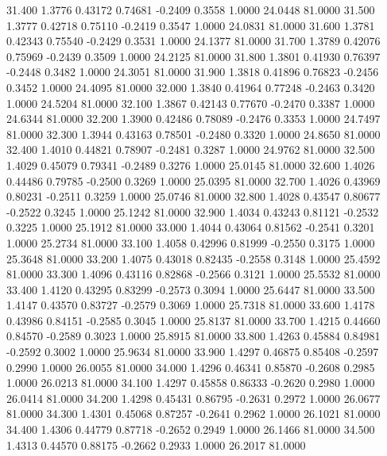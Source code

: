   31.400   1.3776   0.43172   0.74681  -0.2409   0.3558   1.0000  24.0448  81.0000
  31.500   1.3777   0.42718   0.75110  -0.2419   0.3547   1.0000  24.0831  81.0000
  31.600   1.3781   0.42343   0.75540  -0.2429   0.3531   1.0000  24.1377  81.0000
  31.700   1.3789   0.42076   0.75969  -0.2439   0.3509   1.0000  24.2125  81.0000
  31.800   1.3801   0.41930   0.76397  -0.2448   0.3482   1.0000  24.3051  81.0000
  31.900   1.3818   0.41896   0.76823  -0.2456   0.3452   1.0000  24.4095  81.0000
  32.000   1.3840   0.41964   0.77248  -0.2463   0.3420   1.0000  24.5204  81.0000
  32.100   1.3867   0.42143   0.77670  -0.2470   0.3387   1.0000  24.6344  81.0000
  32.200   1.3900   0.42486   0.78089  -0.2476   0.3353   1.0000  24.7497  81.0000
  32.300   1.3944   0.43163   0.78501  -0.2480   0.3320   1.0000  24.8650  81.0000
  32.400   1.4010   0.44821   0.78907  -0.2481   0.3287   1.0000  24.9762  81.0000
  32.500   1.4029   0.45079   0.79341  -0.2489   0.3276   1.0000  25.0145  81.0000
  32.600   1.4026   0.44486   0.79785  -0.2500   0.3269   1.0000  25.0395  81.0000
  32.700   1.4026   0.43969   0.80231  -0.2511   0.3259   1.0000  25.0746  81.0000
  32.800   1.4028   0.43547   0.80677  -0.2522   0.3245   1.0000  25.1242  81.0000
  32.900   1.4034   0.43243   0.81121  -0.2532   0.3225   1.0000  25.1912  81.0000
  33.000   1.4044   0.43064   0.81562  -0.2541   0.3201   1.0000  25.2734  81.0000
  33.100   1.4058   0.42996   0.81999  -0.2550   0.3175   1.0000  25.3648  81.0000
  33.200   1.4075   0.43018   0.82435  -0.2558   0.3148   1.0000  25.4592  81.0000
  33.300   1.4096   0.43116   0.82868  -0.2566   0.3121   1.0000  25.5532  81.0000
  33.400   1.4120   0.43295   0.83299  -0.2573   0.3094   1.0000  25.6447  81.0000
  33.500   1.4147   0.43570   0.83727  -0.2579   0.3069   1.0000  25.7318  81.0000
  33.600   1.4178   0.43986   0.84151  -0.2585   0.3045   1.0000  25.8137  81.0000
  33.700   1.4215   0.44660   0.84570  -0.2589   0.3023   1.0000  25.8915  81.0000
  33.800   1.4263   0.45884   0.84981  -0.2592   0.3002   1.0000  25.9634  81.0000
  33.900   1.4297   0.46875   0.85408  -0.2597   0.2990   1.0000  26.0055  81.0000
  34.000   1.4296   0.46341   0.85870  -0.2608   0.2985   1.0000  26.0213  81.0000
  34.100   1.4297   0.45858   0.86333  -0.2620   0.2980   1.0000  26.0414  81.0000
  34.200   1.4298   0.45431   0.86795  -0.2631   0.2972   1.0000  26.0677  81.0000
  34.300   1.4301   0.45068   0.87257  -0.2641   0.2962   1.0000  26.1021  81.0000
  34.400   1.4306   0.44779   0.87718  -0.2652   0.2949   1.0000  26.1466  81.0000
  34.500   1.4313   0.44570   0.88175  -0.2662   0.2933   1.0000  26.2017  81.0000
